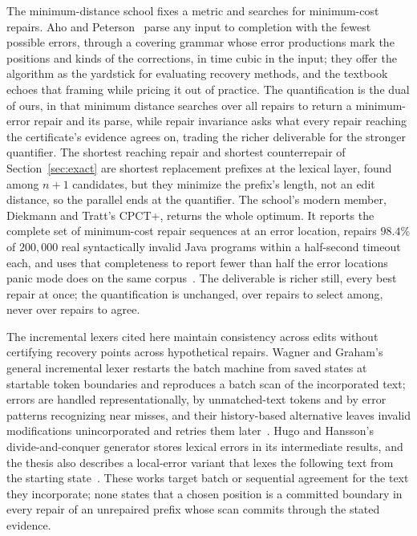 \documentclass[11pt,a4paper]{article}
\theoremstyle{definition}
\theoremstyle{plain}
\theoremstyle{remark}
\begin{document}
The minimum-distance school fixes a metric and searches for minimum-cost repairs. Aho and
Peterson~\citep{aho1972minimum} parse any input to completion with the fewest possible errors, through a covering
grammar whose error productions mark the positions and kinds of the corrections, in time cubic in the input; they offer
the algorithm as the yardstick for evaluating recovery methods, and the textbook echoes that framing while pricing it
out of practice. The quantification is the dual of ours, in that minimum distance searches over all repairs to return a
minimum-error repair and its parse, while repair invariance asks what every repair reaching the certificate's evidence
agrees on, trading the richer deliverable for the stronger quantifier. The shortest reaching repair and shortest
counterrepair of Section~\ref{sec:exact} are shortest replacement prefixes at the lexical layer, found among $n + 1$
candidates, but they minimize the prefix's length, not an edit distance, so the parallel ends at the quantifier. The
school's modern member, Diekmann and Tratt's CPCT+, returns the whole optimum. It reports the complete set of
minimum-cost repair sequences at an error location, repairs $98.4$\% of $200{,}000$ real syntactically invalid Java
programs within a half-second timeout each, and uses that completeness to report fewer than half the error locations
panic mode does on the same corpus~\citep{diekmann2020dontpanic}. The deliverable is richer still, every best repair at
once; the quantification is unchanged, over repairs to select among, never over repairs to agree.

The incremental lexers cited here maintain consistency across edits without certifying recovery points across
hypothetical repairs. Wagner and Graham's general incremental lexer restarts the batch machine from saved states at
startable token boundaries and reproduces a batch scan of the incorporated text; errors are handled representationally,
by unmatched-text tokens and by error patterns recognizing near misses, and their history-based alternative leaves
invalid modifications unincorporated and retries them later~\citep{wagner-lexing}. Hugo and Hansson's divide-and-conquer
generator stores lexical errors in its intermediate results, and the thesis also describes a local-error variant that
lexes the following text from the starting state~\citep{hugo2015incremental}. These works target batch or sequential
agreement for the text they incorporate; none states that a chosen position is a committed boundary in every repair of
an unrepaired prefix whose scan commits through the stated evidence.
\end{document}
